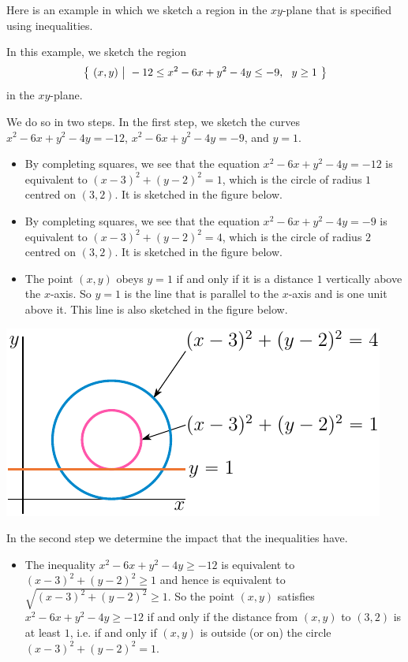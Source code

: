 Here is an example in which we sketch a region in the $xy$-plane that is specified using inequalities.

\begin{eg}
In this example, we sketch the region
\begin{equation*}
\Set{(x,y)}{ -12\le x^2-6x +y^2-4y \le -9,\ \ y\ge 1}
\end{equation*}
in the $xy$-plane.

We do so in two steps. In the first step, we sketch the curves
$x^2-6x +y^2-4y=-12$, $x^2-6x +y^2-4y=-9$, and $y=1$.
\begin{itemize}
\item
By completing squares, we see that the equation  $x^2-6x +y^2-4y=-12$ 
is equivalent to $(x-3)^2 +(y-2)^2 =1$, which is the circle of radius 
$1$ centred on $(3,2)$. It is sketched in the figure below.

\item
By completing squares, we see that the equation  $x^2-6x +y^2-4y=-9$ 
is equivalent to $(x-3)^2 +(y-2)^2 =4$, which is the circle of radius 
$2$ centred on $(3,2)$. It is sketched in the figure below.

\item
The point $(x,y)$ obeys $y=1$ if and only if it is a distance $1$ vertically above the $x$-axis. So $y=1$ is the line that is parallel to the $x$-axis and is one unit above it. This line is also  sketched in the figure below.
\end{itemize}

\begin{efig}
\begin{center}
   \includegraphics{annulusPart.pdf}
\end{center}
\end{efig}

In the second step we determine the impact that the inequalities have.
\begin{itemize}
\item 
The inequality $x^2-6x +y^2-4y\ge -12$ is equivalent to 
$(x-3)^2 +(y-2)^2 \ge 1$ and hence is equivalent to 
$\sqrt{(x-3)^2 +(y-2)^2} \ge 1$. So the point $(x,y)$ satisfies  
$x^2-6x +y^2-4y\ge -12$ if and only if the distance from $(x,y)$ to $(3,2)$
is at least $1$, i.e. if and only if $(x,y)$ is outside (or on) the circle 
$(x-3)^2 +(y-2)^2 = 1$. 


\end{itemize}
\end{eg}
